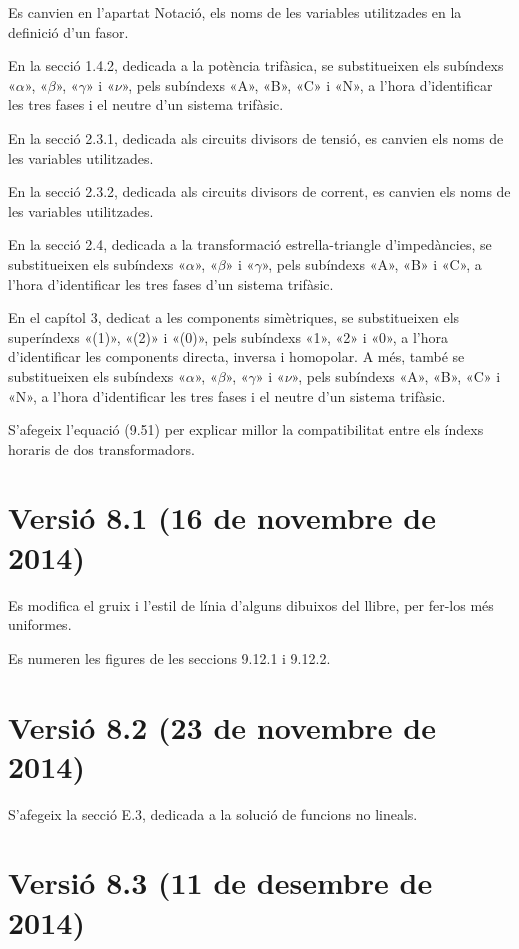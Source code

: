 Es canvien en l'apartat Notació, els noms de les variables utilitzades en la definició d'un fasor.

En la secció 1.4.2, dedicada a la potència trifàsica, se substitueixen els subíndexs «$\alpha$», «$\beta$», «$\gamma$» i «$\nu$», pels subíndexs «A», «B», «C» i «N», a l'hora d'identificar les tres fases  i el neutre d'un sistema trifàsic.

En la secció 2.3.1,  dedicada als circuits divisors de tensió, es canvien els noms de les variables utilitzades.

En la secció 2.3.2,  dedicada als circuits divisors de corrent, es canvien els noms de les variables utilitzades.

En la secció 2.4, dedicada a la transformació estrella-triangle d'impedàncies, se substitueixen els subíndexs «$\alpha$», «$\beta$» i «$\gamma$», pels subíndexs «A», «B» i «C», a l'hora d'identificar les tres fases d'un sistema trifàsic.

En el capítol 3, dedicat a les components simètriques, se substitueixen els superíndexs «(1)», «(2)» i «(0)», pels subíndexs «1», «2» i «0», a l'hora d'identificar les components directa, inversa i homopolar. A més, també se substitueixen els subíndexs «$\alpha$», «$\beta$», «$\gamma$» i «$\nu$», pels subíndexs «A», «B»,  «C» i «N», a l'hora d'identificar les tres fases i el neutre d'un sistema trifàsic.

S'afegeix l'equació (9.51) per explicar millor la compatibilitat entre els índexs horaris de dos transformadors.

\section*{Versió 8.1 (16 de novembre de 2014)}

Es modifica el gruix i l'estil de línia d'alguns dibuixos del llibre, per  fer-los més uniformes.

Es numeren les figures de les seccions 9.12.1 i 9.12.2.


\section*{Versió 8.2 (23 de novembre de 2014)}

S'afegeix la secció E.3, dedicada a la solució de funcions no lineals.

\section*{Versió 8.3 (11 de desembre de 2014)}

